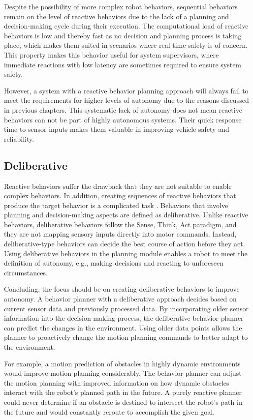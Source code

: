 Despite the possibility of more complex robot behaviors, sequential behaviors remain on the level of reactive behaviors due to the lack of a planning and decision-making cycle during their execution. The computational load of reactive behaviors is low and thereby fast as no decision and planning process is taking place, which makes them suited in scenarios where real-time safety is of concern. This property makes this behavior useful for system supervisors, where immediate reactions with low latency are sometimes required to ensure system safety. 

However, a system with a reactive behavior planning approach will always fail to meet the requirements for higher levels of autonomy due to the reasons discussed in previous chapters. This systematic lack of autonomy does not mean reactive behaviors can not be part of highly autonomous systems. Their quick response time to sensor inputs makes them valuable in improving vehicle safety and reliability. 

\subsection{Deliberative}

Reactive behaviors suffer the drawback that they are not suitable to enable complex behaviors. In addition, creating sequences of reactive behaviors that produce the target behavior is a complicated task \cite{murphy2000}. Behaviors that involve planning and decision-making aspects are defined as deliberative. Unlike reactive behaviors, deliberative behaviors follow the Sense, Think, Act paradigm, and they are not mapping sensory inputs directly into motor commands. Instead, deliberative-type behaviors can decide the best course of action before they act. Using deliberative behaviors in the planning module enables a robot to meet the definition of autonomy, e.g., making decisions and reacting to unforeseen circumstances. 

Concluding, the focus should be on creating deliberative behaviors to improve autonomy. A behavior planner with a deliberative approach decides based on current sensor data and previously processed data. By incorporating older sensor information into the decision-making process, the deliberative behavior planner can predict the changes in the environment. Using older data points allows the planner to proactively change the motion planning commands to better adapt to the environment. 

For example, a motion prediction of obstacles in highly dynamic environments would improve motion planning considerably. The behavior planner can adjust the motion planning with improved information on how dynamic obstacles interact with the robot's planned path in the future. A purely reactive planner could never determine if an obstacle is destined to intersect the robot's path in the future and would constantly reroute to accomplish the given goal.

